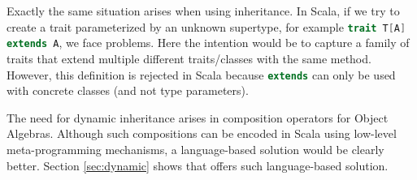 Exactly the same situation arises when using inheritance. In Scala, if we try to
create a trait parameterized by an unknown supertype, for example
\lstinline[language=scala]{trait T[A] extends A}, we face problems. Here the
intention would be to capture a family of traits that extend
multiple different traits/classes with the same method. However, this definition
is rejected in Scala because \lstinline[language=scala]{extends} can only be
used with concrete classes (and not type parameters).
 

The need for dynamic inheritance arises in composition operators for Object
Algebras. Although such compositions can be encoded in Scala using low-level
meta-programming mechanisms, a language-based solution would be clearly better.
Section \ref{sec:dynamic} shows that \name offers such language-based solution.
